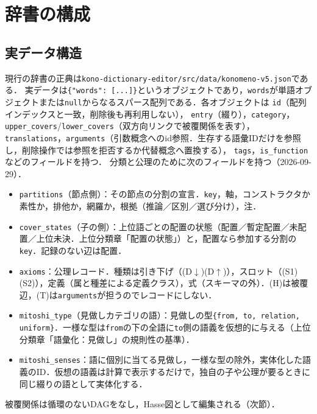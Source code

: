 \documentclass[../../main-detail.tex]{subfiles}
\begin{document}
\section{辞書の構成}

\subsection{実データ構造}
現行の辞書の正典は\texttt{kono-dictionary-editor/src/data/konomeno-v5.json}である．
実データは\texttt{\{"words": [...]\}}というオブジェクトであり，\texttt{words}が単語オブジェクトまたは\texttt{null}からなるスパース配列である．各オブジェクトは
\texttt{id}（配列インデックスと一致，削除後も再利用しない），
\texttt{entry}（綴り），\texttt{category}，
\texttt{upper\_covers}/\texttt{lower\_covers}（双方向リンクで被覆関係を表す），
\texttt{translations}，\texttt{arguments}（引数概念へのid参照．生存する語彙IDだけを参照し，削除操作では参照を拒否するか代替概念へ置換する），
\texttt{tags}，\texttt{is\_function}などのフィールドを持つ．
分類と公理のために次のフィールドを持つ（2026-09-29）．
\begin{itemize}
    \item \texttt{partitions}（節点側）：その節点の分割の宣言．\texttt{key}，軸，コンストラクタか素性か，排他か，網羅か，根拠（推論／区別／選び分け），注．
    \item \texttt{cover\_states}（子の側）：上位語ごとの配置の状態（配置／暫定配置／未配置／上位未決．上位分類章「配置の状態」）と，配置なら参加する分割の\texttt{key}．記録のない辺は配置．
    \item \texttt{axioms}：公理レコード．種類は引き下げ（(D$\downarrow$)(D$\uparrow$)），スロット（(S1)(S2)），定義（属と種差による定義クラス），式（スキーマの外）．(H)は被覆辺，(T)は\texttt{arguments}が担うのでレコードにしない．
    \item \texttt{mitoshi\_type}（見做しカテゴリの語）：見做しの型\texttt{\{from, to, relation, uniform\}}．一様な型は\texttt{from}の下の全語に\texttt{to}側の語義を仮想的に与える（上位分類章「語彙化：見做し」の規則性の基準）．
    \item \texttt{mitoshi\_senses}：語に個別に当てる見做し，一様な型の除外，実体化した語義のID．仮想の語義は計算で表示するだけで，独自の子や公理が要るときに同じ綴りの語として実体化する．
\end{itemize}
被覆関係は循環のないDAGをなし，Hasse図として編集される（次節）．
\end{document}
